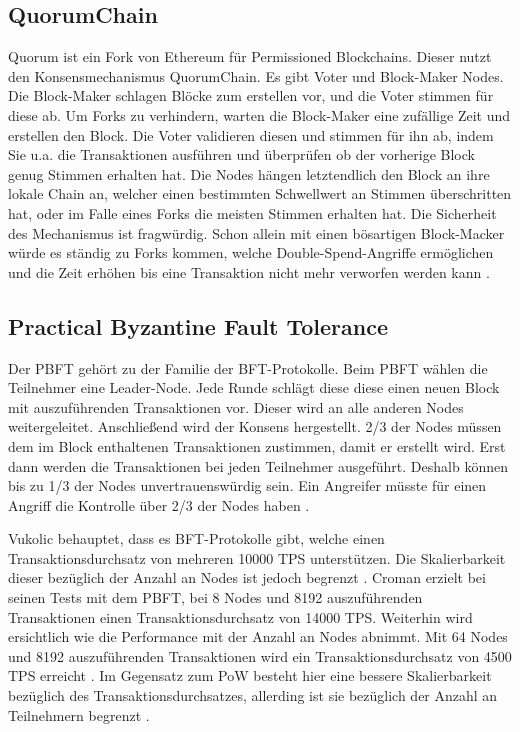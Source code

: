 \subsection{QuorumChain}
Quorum ist ein Fork von Ethereum für Permissioned Blockchains. Dieser nutzt den Konsensmechanismus QuorumChain. Es gibt Voter und Block-Maker Nodes. Die Block-Maker schlagen Blöcke zum erstellen vor, und die Voter stimmen für diese ab. Um Forks zu verhindern, warten die Block-Maker eine zufällige Zeit und erstellen den Block. Die Voter validieren diesen und stimmen für ihn ab, indem Sie u.a. die Transaktionen ausführen und überprüfen ob der vorherige Block genug Stimmen erhalten hat. Die Nodes hängen letztendlich den Block an ihre lokale Chain an, welcher einen bestimmten Schwellwert an Stimmen überschritten hat, oder im Falle eines Forks die meisten Stimmen erhalten hat. Die Sicherheit des Mechanismus ist fragwürdig. Schon allein mit einen bösartigen Block-Macker würde es ständig zu Forks kommen, welche Double-Spend-Angriffe ermöglichen und die Zeit erhöhen bis eine Transaktion nicht mehr verworfen werden kann \cite{CachinBlockchainConsensusProtocols2017}.

\subsection{Practical Byzantine Fault Tolerance}
Der PBFT gehört zu der Familie der BFT-Protokolle. Beim PBFT wählen die Teilnehmer eine Leader-Node. Jede Runde schlägt diese diese einen neuen Block mit auszuführenden Transaktionen vor. Dieser wird an alle anderen Nodes weitergeleitet. Anschließend wird der Konsens hergestellt. 2/3 der Nodes müssen dem im Block enthaltenen Transaktionen zustimmen, damit er erstellt wird. Erst dann werden die Transaktionen bei jeden Teilnehmer ausgeführt. Deshalb können bis zu 1/3 der Nodes unvertrauenswürdig sein. Ein Angreifer müsste für einen Angriff die Kontrolle über 2/3 der Nodes haben \cite{SukhwaniPerformanceModelingPBFT2017a}\cite{ZhengBlockchainChallengesOpportunities2017}. 

Vukolic behauptet, dass es BFT-Protokolle gibt, welche einen Transaktionsdurchsatz von mehreren 10000 TPS unterstützen. Die Skalierbarkeit dieser bezüglich der Anzahl an Nodes ist jedoch begrenzt \cite{Vukolicquestscalableblockchain2015}. Croman erzielt bei seinen Tests mit dem PBFT, bei 8 Nodes und 8192 auszuführenden Transaktionen einen Transaktionsdurchsatz von 14000 TPS. Weiterhin wird ersichtlich wie die Performance mit der Anzahl an Nodes abnimmt. Mit 64 Nodes und 8192 auszuführenden Transaktionen wird ein Transaktionsdurchsatz von 4500 TPS erreicht \cite{CromanScalingDecentralizedBlockchains2016}. Im Gegensatz zum PoW besteht hier eine bessere Skalierbarkeit bezüglich des Transaktionsdurchsatzes, allerding ist sie bezüglich der Anzahl an Teilnehmern begrenzt \cite{Vukolicquestscalableblockchain2015}.

